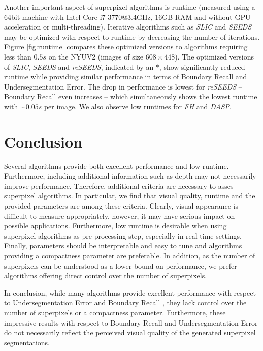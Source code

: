 \documentclass[runningheads]{llncs}
\begin{document}
    Another important aspect of superpixel algorithms is runtime (measured using a 64bit machine with Intel Core i7-3770@3.4GHz, 16GB RAM and without GPU acceleration or multi-threading). Iterative algorithms such as \textit{SLIC} and \textit{SEEDS} may be optimized with respect to runtime by decreasing the number of iterations. Figure \ref{fig:runtime} compares these optimized versions to algorithms requiring less than $0.5s$ on the NYUV2 (images of size $608 \times 448$). The optimized versions of \textit{SLIC}, \textit{SEEDS} and \textit{reSEEDS}, indicated by an $\ast$, show significantly reduced runtime while providing similar performance in terms of Boundary Recall and Undersegmentation Error. The drop in performance is lowest for \textit{reSEEDS} -- Boundary Recall even increases -- which simultaneously shows the lowest runtime with $\sim0.05s$ per image. We also observe low runtimes for \textit{FH} and \textit{DASP}.
    
    \vspace{-1mm}
    \section{Conclusion}
    \vspace{-0.5mm}
    \label{sec:conclusion}

    Several algorithms provide both excellent performance and low runtime. Furthermore, including additional information such as depth may not necessarily improve performance. Therefore, additional criteria are necessary to asses superpixel algorithms. In particular, we find that visual quality, runtime and the provided parameters are among these criteria. Clearly, visual appearance is difficult to measure appropriately, however, it may have serious impact on possible applications. Furthermore, low runtime is desirable when using superpixel algorithms as pre-processing step, especially in real-time settings. Finally, parameters should be interpretable and easy to tune and algorithms providing a compactness parameter are preferable. In addition, as the number of superpixels can be understood as a lower bound on performance, we prefer algorithms offering direct control over the number of superpixels.
    
    In conclusion, while many algorithms provide excellent performance with respect to Undersegmentation Error \cite{LevinshteinStereKutulakosFleetDickinsonSiddiqi:2009,NeubertProtzel:2012} and Boundary Recall \cite{MartinFowlkesMalik:2004}, they lack control over the number of superpixels or a compactness parameter.
    Furthermore, these impressive results with respect to Boundary Recall and Undersegmentation Error do not necessarily reflect the perceived visual quality of the generated superpixel segmentations.
    
	
	
\end{document}
